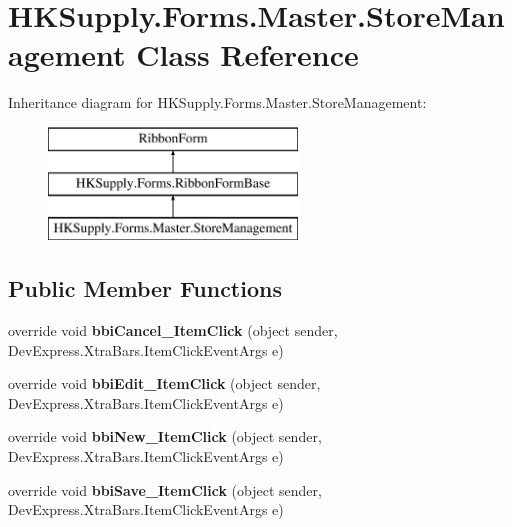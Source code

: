 \hypertarget{class_h_k_supply_1_1_forms_1_1_master_1_1_store_management}{}\section{H\+K\+Supply.\+Forms.\+Master.\+Store\+Management Class Reference}
\label{class_h_k_supply_1_1_forms_1_1_master_1_1_store_management}
Inheritance diagram for H\+K\+Supply.\+Forms.\+Master.\+Store\+Management\+:\begin{figure}[H]
\begin{center}
\leavevmode
\includegraphics[height=3.000000cm]{class_h_k_supply_1_1_forms_1_1_master_1_1_store_management}
\end{center}
\end{figure}
\subsection*{Public Member Functions}
\begin{DoxyCompactItemize}
\item 
\mbox{\label{class_h_k_supply_1_1_forms_1_1_master_1_1_store_management_a7bc34625aa0c307a302e1a17cf59c0d6}} 
override void {\bfseries bbi\+Cancel\+\_\+\+Item\+Click} (object sender, Dev\+Express.\+Xtra\+Bars.\+Item\+Click\+Event\+Args e)
\item 
\mbox{\label{class_h_k_supply_1_1_forms_1_1_master_1_1_store_management_a976ba09e1d7d82c1ccbad6d26c1f9773}} 
override void {\bfseries bbi\+Edit\+\_\+\+Item\+Click} (object sender, Dev\+Express.\+Xtra\+Bars.\+Item\+Click\+Event\+Args e)
\item 
\mbox{\label{class_h_k_supply_1_1_forms_1_1_master_1_1_store_management_aca57310238ff3381ac2fa5f6c8b9cac8}} 
override void {\bfseries bbi\+New\+\_\+\+Item\+Click} (object sender, Dev\+Express.\+Xtra\+Bars.\+Item\+Click\+Event\+Args e)
\item 
\mbox{\label{class_h_k_supply_1_1_forms_1_1_master_1_1_store_management_a68859afec2ac0846619f8bb25b9eaa64}} 
override void {\bfseries bbi\+Save\+\_\+\+Item\+Click} (object sender, Dev\+Express.\+Xtra\+Bars.\+Item\+Click\+Event\+Args e)
\end{DoxyCompactItemize}
